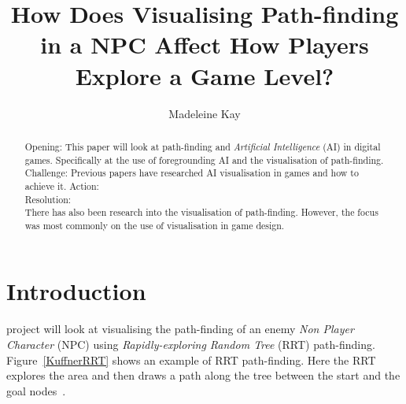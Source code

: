 \documentclass[journal]{IEEEtran}
\begin{document}
%
\title{ How Does Visualising Path-finding in a NPC Affect How Players Explore a Game Level?}
%
%
\author{Madeleine Kay}


\maketitle

\begin{abstract}
	Opening: This paper will look at path-finding and \textit{Artificial Intelligence} (AI) in digital games.   Specifically at the use of foregrounding AI and the visualisation of path-finding. \\
	Challenge: Previous papers have researched AI visualisation in games and how to achieve it. 
	Action: \\
	Resolution: \\
	
	There has also been research into the visualisation of path-finding. However, the focus was most commonly on the use of visualisation in game design.
\end{abstract}

\section{Introduction} \label{introduction}
% 
% 
% 
% 
 project will look at visualising the path-finding of an enemy \textit{Non Player Character} (NPC) using \textit{Rapidly-exploring Random Tree} (RRT) path-finding.  Figure~\ref{KuffnerRRT} shows an example of RRT path-finding. Here the RRT explores the area and then draws a path along the tree between the start and the goal nodes~\cite{Kuffner2000}. 
\end{document}
